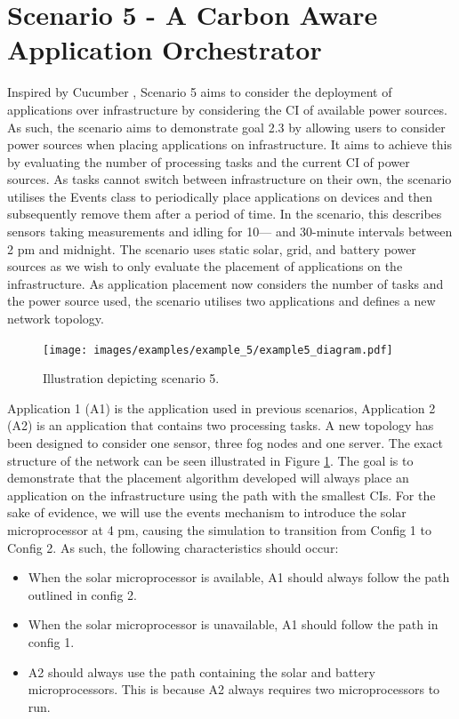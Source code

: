 \documentclass{l4proj}
\begin{document}
\section{Scenario 5 - A Carbon Aware Application Orchestrator}\label{eval:subsec:scenario 5}
Inspired by Cucumber \citep{cucumber}, Scenario 5 aims to consider the deployment of applications over infrastructure by considering the CI of available power sources.
As such, the scenario aims to demonstrate goal 2.3 by allowing users to consider power sources when placing applications on infrastructure.
It aims to achieve this by evaluating the number of processing tasks and the current CI of power sources.
As tasks cannot switch between infrastructure on their own, the scenario utilises the Events class to periodically place applications on devices and then subsequently remove them after a period of time.
In the scenario, this describes sensors taking measurements and idling for 10— and 30-minute intervals between 2 pm and midnight.
The scenario uses static solar, grid, and battery power sources as we wish to only evaluate the placement of applications on the infrastructure.
As application placement now considers the number of tasks and the power source used, the scenario utilises two applications and defines a new network topology.

\begin{figure}[h]
    \centering
    \texttt{[image: images/examples/example\_5/example5\_diagram.pdf]}
    ~
    \caption{Illustration depicting scenario 5.}
    \label{fig:example5_diagram}
\end{figure}

Application 1 (A1) is the application used in previous scenarios, Application 2 (A2) is an application that contains two processing tasks.
A new topology has been designed to consider one sensor, three fog nodes and one server.
The exact structure of the network can be seen illustrated in Figure \ref{fig:example5_diagram}.
The goal is to demonstrate that the placement algorithm developed will always place an application on the infrastructure using the path with the smallest CIs.
For the sake of evidence, we will use the events mechanism to introduce the solar microprocessor at 4 pm, causing the simulation to transition from Config 1 to Config 2.
As such, the following characteristics should occur:
\begin{itemize}
    \item When the solar microprocessor is available, A1 should always follow the path outlined in config 2.
    \item When the solar microprocessor is unavailable, A1 should follow the path in config 1.
    \item A2 should always use the path containing the solar and battery microprocessors. This is because A2 always requires two microprocessors to run.
\end{itemize}
\end{document}
